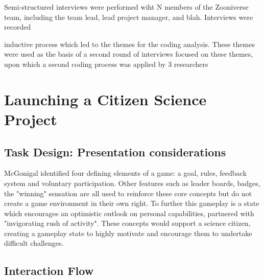 \documentclass{sigchi}
\begin{document}
Semi-structured interviews were performed wiht N members of the
Zooniverse team, including the team lead, lead project manager, and
blah.  Interviews were recorded 

inductive process which led to the themes for the coding analysis.
These themes were used as the basis of a second round of interviews
focused on these themes, upon  which a second coding process was 
applied by 3 researchers 

\section{Launching a Citizen Science Project}


\subsection{Task Design: Presentation considerations}

McGonigal identified four defining elements of a game: a goal, rules, feedback system and voluntary participation. Other features such as leader boards, badges, the "winning" sensation are all used to reinforce these core concepts but do not create a game environment in their own right. \cite{mcgonigal2011reality} To further this gameplay is a state which encourages an optimistic outlook on personal capabilities, partnered with "invigorating rush of activity". \cite{mcgonigal2011reality} These concepts would support a science citizen, creating a gameplay state to highly motivate and encourage them to undertake difficult challenges. 




\subsection{Interaction Flow}
\end{document}
